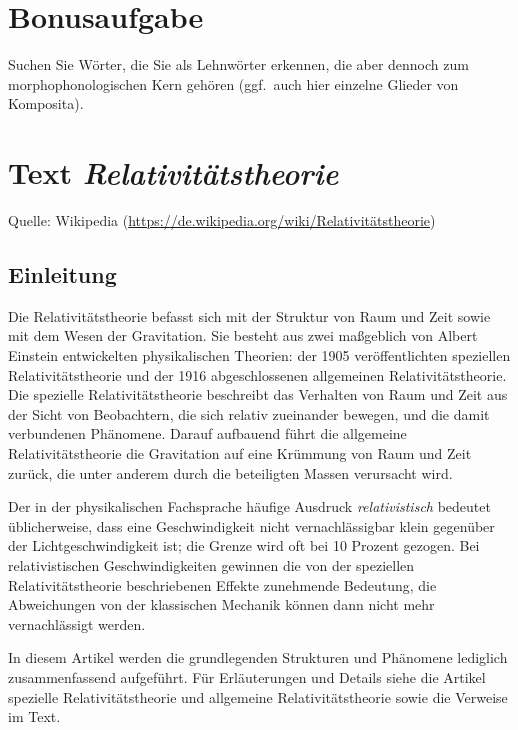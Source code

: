 \documentclass[12pt,a4paper,twoside]{article}
\newenvironment{nohyphens}{%
  \par
  \hyphenpenalty=10000
  \exhyphenpenalty=10000
  \sloppy
}{\par}
\begin{document}
\section{Bonusaufgabe}

Suchen Sie Wörter, die Sie als Lehnwörter erkennen, die aber dennoch zum morphophonologischen Kern gehören (ggf.\ auch hier einzelne Glieder von Komposita).


\section*{Text \textit{Relativitätstheorie}}

Quelle: Wikipedia (\url{https://de.wikipedia.org/wiki/Relativitätstheorie})

\begin{nohyphens}

\subsection*{Einleitung}

Die Relativitätstheorie befasst sich mit der Struktur von Raum und Zeit sowie mit dem Wesen der Gravitation. Sie besteht aus zwei maßgeblich von Albert Einstein entwickelten physikalischen Theorien: der 1905 veröffentlichten speziellen Relativitätstheorie und der 1916 abgeschlossenen allgemeinen Relativitätstheorie. Die spezielle Relativitätstheorie beschreibt das Verhalten von Raum und Zeit aus der Sicht von Beobachtern, die sich relativ zueinander bewegen, und die damit verbundenen Phänomene. Darauf aufbauend führt die allgemeine Relativitätstheorie die Gravitation auf eine Krümmung von Raum und Zeit zurück, die unter anderem durch die beteiligten Massen verursacht wird.

Der in der physikalischen Fachsprache häufige Ausdruck \textit{relativistisch} bedeutet üblicherweise, dass eine Geschwindigkeit nicht vernachlässigbar klein gegenüber der Lichtgeschwindigkeit ist; die Grenze wird oft bei 10 Prozent gezogen. Bei relativistischen Geschwindigkeiten gewinnen die von der speziellen Relativitätstheorie beschriebenen Effekte zunehmende Bedeutung, die Abweichungen von der klassischen Mechanik können dann nicht mehr vernachlässigt werden.

In diesem Artikel werden die grundlegenden Strukturen und Phänomene lediglich zusammenfassend aufgeführt. Für Erläuterungen und Details siehe die Artikel spezielle Relativitätstheorie und allgemeine Relativitätstheorie sowie die Verweise im Text.



\end{nohyphens}
\end{document}
